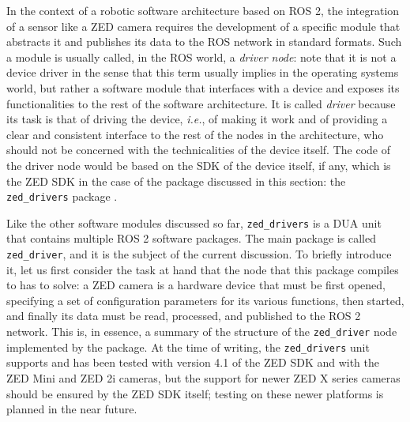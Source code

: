 In the context of a robotic software architecture based on ROS 2, the integration of a sensor like a ZED camera requires the development of a specific module that abstracts it and publishes its data to the ROS network in standard formats. Such a module is usually called, in the ROS world, a \emph{driver node}: note that it is not a device driver in the sense that this term usually implies in the operating systems world, but rather a software module that interfaces with a device and exposes its functionalities to the rest of the software architecture. It is called \emph{driver} because its task is that of driving the device, \emph{i.e.}, of making it work and of providing a clear and consistent interface to the rest of the nodes in the architecture, who should not be concerned with the technicalities of the device itself. The code of the driver node would be based on the SDK of the device itself, if any, which is the ZED SDK in the case of the package discussed in this section: the \texttt{zed\_drivers} package \cite{masocco_zed_drivers_nodate}.

Like the other software modules discussed so far, \texttt{zed\_drivers} is a DUA unit that contains multiple ROS 2 software packages. The main package is called \texttt{zed\_driver}, and it is the subject of the current discussion. To briefly introduce it, let us first consider the task at hand that the node that this package compiles to has to solve: a ZED camera is a hardware device that must be first opened, specifying a set of configuration parameters for its various functions, then started, and finally its data must be read, processed, and published to the ROS 2 network. This is, in essence, a summary of the structure of the \texttt{zed\_driver} node implemented by the package. At the time of writing, the \texttt{zed\_drivers} unit supports and has been tested with version 4.1 of the ZED SDK and with the ZED Mini and ZED 2i cameras, but the support for newer ZED X series cameras should be ensured by the ZED SDK itself; testing on these newer platforms is planned in the near future.

